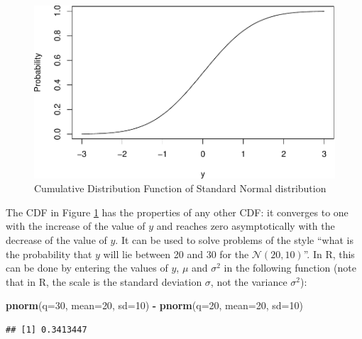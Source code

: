\documentclass[
]{book}
\newenvironment{Shaded}{\begin{snugshade}}{\end{snugshade}}
\newcommand{\AttributeTok}[1]{\textcolor[rgb]{0.13,0.29,0.53}{#1}}
\newcommand{\DecValTok}[1]{\textcolor[rgb]{0.00,0.00,0.81}{#1}}
\newcommand{\FunctionTok}[1]{\textcolor[rgb]{0.13,0.29,0.53}{\textbf{#1}}}
\newcommand{\NormalTok}[1]{#1}
\newcommand{\SpecialCharTok}[1]{\textcolor[rgb]{0.81,0.36,0.00}{\textbf{#1}}}
\theoremstyle{definition}
\theoremstyle{definition}
\theoremstyle{definition}
\theoremstyle{definition}
\theoremstyle{remark}
\begin{document}
\begin{figure}
\centering
\includegraphics{Svetunkov---Statistics-for-Business-Analytics_files/figure-latex/pnormPlot-1.pdf}
\caption{\label{fig:pnormPlot}Cumulative Distribution Function of Standard Normal distribution}
\end{figure}

The CDF in Figure \ref{fig:pnormPlot} has the properties of any other CDF: it converges to one with the increase of the value of \(y\) and reaches zero asymptotically with the decrease of the value of \(y\). It can be used to solve problems of the style ``what is the probability that \(y\) will lie between 20 and 30 for the \(\mathcal{N}(20, 10)\)''. In R, this can be done by entering the values of \(y\), \(\mu\) and \(\sigma^2\) in the following function (note that in R, the scale is the standard deviation \(\sigma\), not the variance \(\sigma^2\)):

\begin{Shaded}
\begin{Highlighting}[]
\FunctionTok{pnorm}\NormalTok{(}\AttributeTok{q=}\DecValTok{30}\NormalTok{, }\AttributeTok{mean=}\DecValTok{20}\NormalTok{, }\AttributeTok{sd=}\DecValTok{10}\NormalTok{) }\SpecialCharTok{{-}} \FunctionTok{pnorm}\NormalTok{(}\AttributeTok{q=}\DecValTok{20}\NormalTok{, }\AttributeTok{mean=}\DecValTok{20}\NormalTok{, }\AttributeTok{sd=}\DecValTok{10}\NormalTok{)}
\end{Highlighting}
\end{Shaded}

\begin{verbatim}
## [1] 0.3413447
\end{verbatim}
\end{document}
